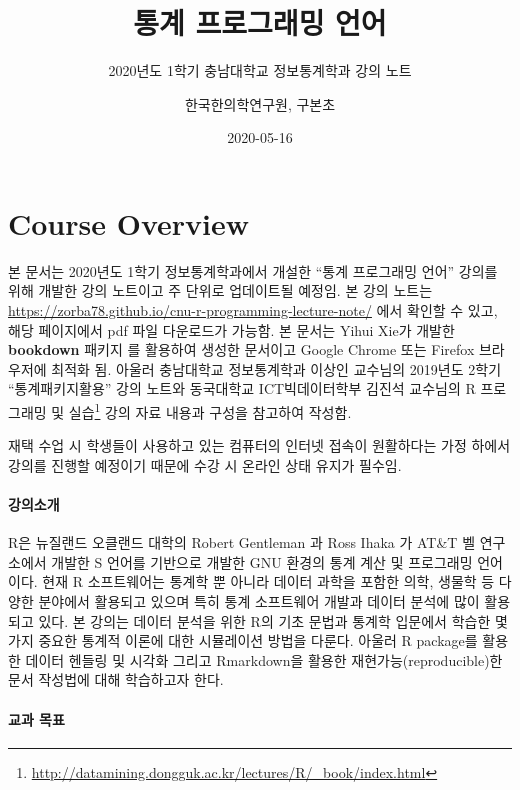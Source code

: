 \documentclass[
  11pt,
]{krantz}
\title{통계 프로그래밍 언어}
\subtitle{2020년도 1학기 충남대학교 정보통계학과 강의 노트}
\author{한국한의학연구원, 구본초}
\date{2020-05-16}
\renewcommand{\href}[2]{#2\footnote{\url{#1}}}
\let\BeginKnitrBlock\begin \let\EndKnitrBlock\end
\begin{document}
\maketitle

{
\hypersetup{linkcolor=}
\setcounter{tocdepth}{2}
\tableofcontents
}
\listoftables
\listoffigures
\hypertarget{overview}{%
\chapter*{Course Overview}\label{overview}}


\BeginKnitrBlock{rmdnote}
본 문서는 2020년도 1학기 정보통계학과에서 개설한 ``통계 프로그래밍 언어'' 강의를 위해 개발한 강의 노트이고 주 단위로 업데이트될 예정임. 본 강의 노트는 \url{https://zorba78.github.io/cnu-r-programming-lecture-note/} 에서 확인할 수 있고, 해당 페이지에서 pdf 파일 다운로드가 가능함. 본 문서는 Yihui Xie가 개발한 \textbf{bookdown} 패키지 \citep{xie-2016}를 활용하여 생성한 문서이고 Google Chrome 또는 Firefox 브라우저에 최적화 됨. 아울러 충남대학교 정보통계학과 이상인 교수님의 2019년도 2학기 ``통계패키지활용'' 강의 노트와 동국대학교 ICT빅데이터학부 김진석 교수님의 \href{http://datamining.dongguk.ac.kr/lectures/R/_book/index.html}{R 프로그래밍 및 실습} 강의 자료 내용과 구성을 참고하여 작성함.

재택 수업 시 학생들이 사용하고 있는 컴퓨터의 인터넷 접속이 원활하다는 가정 하에서 강의를 진행할 예정이기 때문에 수강 시 온라인 상태 유지가 필수임.
\EndKnitrBlock{rmdnote}

\hypertarget{intro-lec}{%
\subsubsection*{강의소개}\label{intro-lec}}


R은 뉴질랜드 오클랜드 대학의 Robert Gentleman 과 Ross Ihaka 가 AT\&T 벨 연구소에서 개발한 S 언어를 기반으로 개발한 GNU 환경의 통계 계산 및 프로그래밍 언어이다. 현재 R 소프트웨어는 통계학 뿐 아니라 데이터 과학을 포함한 의학, 생물학 등 다양한 분야에서 활용되고 있으며 특히 통계 소프트웨어 개발과 데이터 분석에 많이 활용되고 있다. 본 강의는 데이터 분석을 위한 R의 기초 문법과 통계학 입문에서 학습한 몇 가지 중요한 통계적 이론에 대한 시뮬레이션 방법을 다룬다. 아울러 R package를 활용한 데이터 헨들링 및 시각화 그리고 Rmarkdown을 활용한 재현가능(reproducible)한 문서 작성법에 대해 학습하고자 한다.

\hypertarget{purpose-course}{%
\subsubsection*{교과 목표}\label{purpose-course}}
\end{document}
